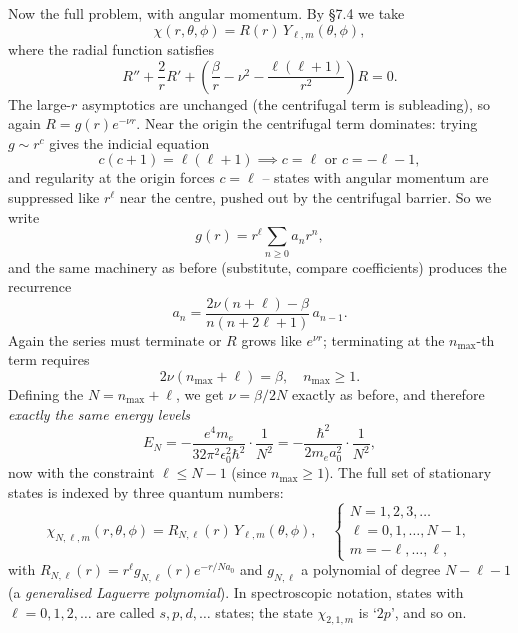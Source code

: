 \documentclass[a4paper]{scrartcl}
\begin{document}
Now the full problem, with angular momentum. By \S 7.4 we take
$$
\chi(r, \theta, \phi) = R(r) \, Y_{\ell, m}(\theta, \phi),
$$
where the radial function satisfies
$$
R'' + \frac{2}{r} R' + \left( \frac{\beta}{r} - \nu^2 - \frac{\ell(\ell+1)}{r^2} \right) R = 0.
$$
The large-$r$ asymptotics are unchanged (the centrifugal term is subleading), so again $R = g(r) e^{-\nu r}$. Near the origin the centrifugal term dominates: trying $g \sim r^c$ gives the indicial equation
$$
c(c + 1) = \ell(\ell+1) \implies c = \ell \text{ or } c = -\ell - 1,
$$
and regularity at the origin forces $c = \ell$ -- states with angular momentum are suppressed like $r^\ell$ near the centre, pushed out by the centrifugal barrier. So we write
$$
g(r) = r^\ell \sum_{n \geq 0} a_n r^n,
$$
and the same machinery as before (substitute, compare coefficients) produces the recurrence
$$
a_n = \frac{2\nu (n + \ell) - \beta}{n (n + 2\ell + 1)} \, a_{n-1}.
$$
Again the series must terminate or $R$ grows like $e^{\nu r}$; terminating at the $n_{\max}$-th term requires
$$
2 \nu (n_{\max} + \ell) = \beta, \quad n_{\max} \geq 1.
$$
Defining the  $N = n_{\max} + \ell$, we get $\nu = \beta/2N$ exactly as before, and therefore \emph{exactly the same energy levels}
$$
E_N = -\frac{e^4 m_e}{32 \pi^2 \epsilon_0^2 \hbar^2} \cdot \frac{1}{N^2} = -\frac{\hbar^2}{2 m_e a_0^2} \cdot \frac{1}{N^2},
$$
now with the constraint $\ell \leq N - 1$ (since $n_{\max} \geq 1$). The full set of stationary states is indexed by three quantum numbers:
$$
\chi_{N, \ell, m}(r, \theta, \phi) = R_{N, \ell}(r) \, Y_{\ell, m}(\theta, \phi), \quad
\begin{cases}
    N = 1, 2, 3, \dots \\
    \ell = 0, 1, \dots, N - 1, \\
    m = -\ell, \dots, \ell,
\end{cases}
$$
with $R_{N, \ell}(r) = r^\ell g_{N, \ell}(r) e^{-r/N a_0}$ and $g_{N, \ell}$ a polynomial of degree $N - \ell - 1$ (a \emph{generalised Laguerre polynomial}). In spectroscopic notation, states with $\ell = 0, 1, 2, \dots$ are called $s, p, d, \dots$ states; the state $\chi_{2,1,m}$ is `$2p$', and so on.
\end{document}
